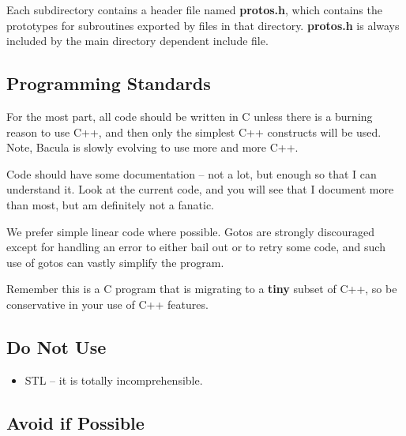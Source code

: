 Each subdirectory contains a header file named {\bf protos.h}, which contains
the prototypes for subroutines exported by files in that directory. {\bf
protos.h} is always included by the main directory dependent include file. 

\subsection{Programming Standards}

For the most part, all code should be written in C unless there is a burning
reason to use C++, and then only the simplest C++ constructs will be used.
Note, Bacula is slowly evolving to use more and more C++. 

Code should have some documentation -- not a lot, but enough so that I can
understand it. Look at the current code, and you will see that I document more
than most, but am definitely not a fanatic. 

We prefer simple linear code where possible. Gotos are strongly discouraged
except for handling an error to either bail out or to retry some code, and
such use of gotos can vastly simplify the program. 

Remember this is a C program that is migrating to a {\bf tiny} subset of C++,
so be conservative in your use of C++ features. 

\subsection{Do Not Use}

\begin{itemize}
 \item STL -- it is totally incomprehensible. 
\end{itemize}

\subsection{Avoid if Possible}

